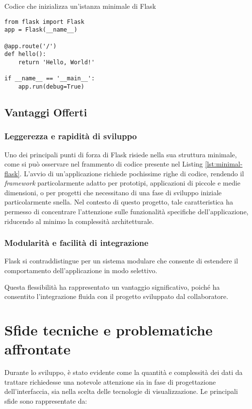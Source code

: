 \begin{listing}[H]
\caption{Codice che inizializza un'istanza minimale di Flask}
\label{lst:minimal-flask} %
\begin{verbatim}
from flask import Flask
app = Flask(__name__)

@app.route('/')
def hello():
    return 'Hello, World!'

if __name__ == '__main__':
    app.run(debug=True)
\end{verbatim}
\end{listing}


\subsection{Vantaggi Offerti}
\subsubsection*{Leggerezza e rapidità di sviluppo}
Uno dei principali punti di forza di Flask risiede nella sua struttura minimale, come si può osservare nel frammento di codice presente nel Listing \ref{lst:minimal-flask}. L'avvio di un'applicazione richiede pochissime righe di codice, rendendo il \textit{framework} particolarmente adatto per prototipi, applicazioni di piccole e medie dimensioni, o per progetti che necessitano di una fase di sviluppo iniziale particolarmente snella.  
Nel contesto di questo progetto, tale caratteristica ha permesso di concentrare l'attenzione sulle funzionalità specifiche dell'applicazione, riducendo al minimo la complessità architetturale.

\subsubsection*{Modularità e facilità di integrazione}
Flask si contraddistingue per un sistema modulare che consente di estendere il comportamento dell'applicazione in modo selettivo. \cite{flask-docs}

Questa flessibilità ha rappresentato un vantaggio significativo, poiché ha consentito l'integrazione fluida con il progetto sviluppato dal collaboratore.

\section{Sfide tecniche e problematiche affrontate}

Durante lo sviluppo, è stato evidente come la quantità e complessità dei dati da trattare richiedesse una notevole attenzione sia in fase di progettazione dell'interfaccia, sia nella scelta delle tecnologie di visualizzazione. Le principali sfide sono rappresentate da:


